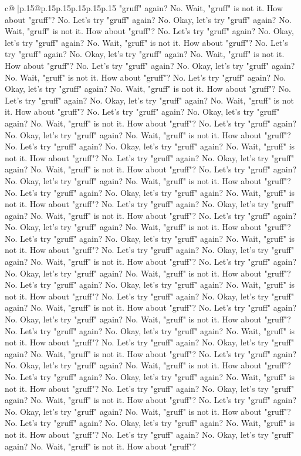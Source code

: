 \documentclass{article}
\begin{document}
{\begin{supertabular}{c@{$\;$}|p{.15\linewidth}@{}p{.15\linewidth}p{.15\linewidth}p{.15\linewidth}p{.15\linewidth}p{.15\linewidth}}
{{{"gruff" again? No. Wait, "gruff" is not it. How about "gruff"? No. Let's try "gruff" again? No. Okay, let's try "gruff" again? No. Wait, "gruff" is not it. How about "gruff"? No. Let's try "gruff" again? No. Okay, let's try "gruff" again? No. Wait, "gruff" is not it. How about "gruff"? No. Let's try "gruff" again? No. Okay, let's try "gruff" again? No. Wait, "gruff" is not it. How about "gruff"? No. Let's try "gruff" again? No. Okay, let's try "gruff" again? No. Wait, "gruff" is not it. How about "gruff"? No. Let's try "gruff" again? No. Okay, let's try "gruff" again? No. Wait, "gruff" is not it. How about "gruff"? No. Let's try "gruff" again? No. Okay, let's try "gruff" again? No. Wait, "gruff" is not it. How about "gruff"? No. Let's try "gruff" again? No. Okay, let's try "gruff" again? No. Wait, "gruff" is not it. How about "gruff"? No. Let's try "gruff" again? No. Okay, let's try "gruff" again? No. Wait, "gruff" is not it. How about "gruff"? No. Let's try "gruff" again? No. Okay, let's try "gruff" again? No. Wait, "gruff" is not it. How about "gruff"? No. Let's try "gruff" again? No. Okay, let's try "gruff" again? No. Wait, "gruff" is not it. How about "gruff"? No. Let's try "gruff" again? No. Okay, let's try "gruff" again? No. Wait, "gruff" is not it. How about "gruff"? No. Let's try "gruff" again? No. Okay, let's try "gruff" again? No. Wait, "gruff" is not it. How about "gruff"? No. Let's try "gruff" again? No. Okay, let's try "gruff" again? No. Wait, "gruff" is not it. How about "gruff"? No. Let's try "gruff" again? No. Okay, let's try "gruff" again? No. Wait, "gruff" is not it. How about "gruff"? No. Let's try "gruff" again? No. Okay, let's try "gruff" again? No. Wait, "gruff" is not it. How about "gruff"? No. Let's try "gruff" again? No. Okay, let's try "gruff" again? No. Wait, "gruff" is not it. How about "gruff"? No. Let's try "gruff" again? No. Okay, let's try "gruff" again? No. Wait, "gruff" is not it. How about "gruff"? No. Let's try "gruff" again? No. Okay, let's try "gruff" again? No. Wait, "gruff" is not it. How about "gruff"? No. Let's try "gruff" again? No. Okay, let's try "gruff" again? No. Wait, "gruff" is not it. How about "gruff"? No. Let's try "gruff" again? No. Okay, let's try "gruff" again? No. Wait, "gruff" is not it. How about "gruff"? No. Let's try "gruff" again? No. Okay, let's try "gruff" again? No. Wait, "gruff" is not it. How about "gruff"? No. Let's try "gruff" again? No. Okay, let's try "gruff" again? No. Wait, "gruff" is not it. How about "gruff"? No. Let's try "gruff" again? No. Okay, let's try "gruff" again? No. Wait, "gruff" is not it. How about "gruff"? No. Let's try "gruff" again? No. Okay, let's try "gruff" again? No. Wait, "gruff" is not it. How about "gruff"? No. Let's try "gruff" again? No. Okay, let's try "gruff" again? No. Wait, "gruff" is not it. How about "gruff"? No. Let's try "gruff" again? No. Okay, let's try "gruff" again? No. Wait, "gruff" is not it. How about "gruff"? No. Let's try "gruff" again? No. Okay, let's try "gruff" again? No. Wait, "gruff" is not it. How about "gruff"? No. Let's try "gruff" again? No. Okay, let's try "gruff" again? No. Wait, "gruff" is not it. How about "gruff"? }}}
\end{supertabular}}
\end{document}
